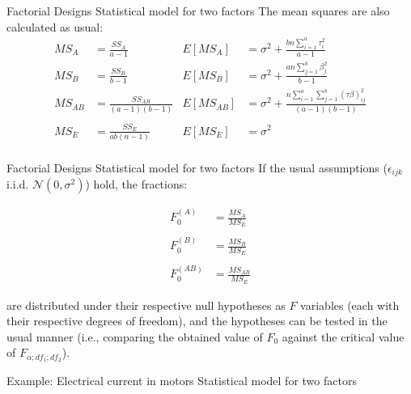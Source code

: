 \documentclass[t]{beamer}
\begin{document}

\begin{ftst}
{Factorial Designs}
{Statistical model for two factors}
The mean squares are also calculated as usual:
\begin{align*}
MS_A		&= \frac{SS_A}{a-1} 				& E\left[MS_A\right] 	& = \sigma^2 + \frac{bn\sum\limits_{i=1}^{a}\tau_i^2}{a-1}\\
MS_B		&= \frac{SS_B}{b-1} 				& E\left[MS_B\right] 	& = \sigma^2 + \frac{an\sum\limits_{j=1}^{b}\beta_j^2}{b-1}\\
MS_{AB} 	&= \frac{SS_{AB}}{(a-1)(b-1)}	&E\left[MS_{AB}\right] & =\sigma^2 + \frac{n\sum\limits_{i=1}^{a}\sum\limits_{j=1}^{b}(\tau\beta)_{ij}^2}{(a-1)(b-1)}\\
\ \\
MS_E 		&= \frac{SS_E}{ab(n-1)}			&E\left[MS_E\right] 	&= \sigma^2\\
\end{align*}
\end{ftst}


\begin{ftst}
{Factorial Designs}
{Statistical model for two factors}
If the usual assumptions ($\epsilon_{ijk}$ i.i.d. $\mathcal{N}(0, \sigma^2)$) hold, the fractions:

\begin{align*}
F_0^{(A)} &= \frac{MS_A}{MS_E}\\
\ \\
F_0^{(B)} &= \frac{MS_B}{MS_E}\\
\ \\
F_0^{(AB)} &= \frac{MS_{AB}}{MS_E}
\end{align*}
\vhalf

are distributed under their respective null hypotheses as $F$ variables (each with their respective degrees of freedom), and the hypotheses can be tested in the usual manner (i.e., comparing the obtained value of $F_0$ against the critical value of $F_{\alpha;df_1;df_2}$).
\end{ftst}


\begin{ftstf}
{Example: Electrical current in motors}
{Statistical model for two factors}
\end{ftstf}
\end{document}
